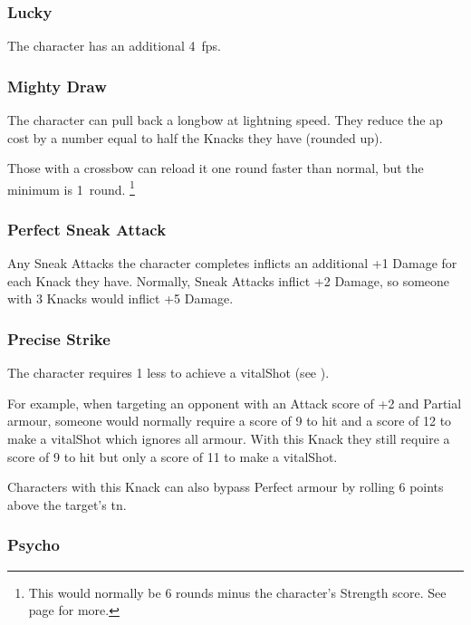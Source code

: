 \begin{multicols}{2}
\subsubsection{Lucky}

The character has an additional 4~\glspl{fp}.

\subsubsection{Mighty Draw}

The character can pull back a longbow at lightning speed.
They reduce the \gls{ap} cost by a number equal to half the Knacks they have (rounded up).

Those with a crossbow can reload it one round faster than normal, but the minimum is 1~round.%
\footnote{This would normally be 6 rounds minus the character's Strength score. See page \pageref{crossbow} for more.}

\subsubsection{Perfect Sneak Attack}

Any Sneak Attacks the character completes inflicts an additional +1 Damage for each Knack they have.
Normally, Sneak Attacks inflict +2 Damage, so someone with 3 Knacks would inflict +5 Damage.

\subsubsection{Precise Strike}\label{precisestrike}

The character requires 1 less to achieve a \gls{vitalShot} (see ).

\begin{exampletext}
  For example, when targeting an opponent with an Attack score of +2 and Partial armour, someone would normally require a score of 9 to hit and a score of 12 to make a \gls{vitalShot} which ignores all armour.
  With this Knack they still require a score of 9 to hit but only a score of 11 to make a \gls{vitalShot}.
\end{exampletext}

Characters with this Knack can also bypass Perfect armour by rolling 6 points above the target's \gls{tn}.

\subsubsection{Psycho}


\end{multicols}
